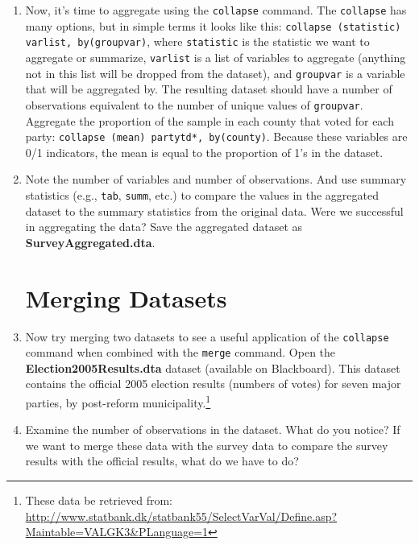 \documentclass[a4paper,12pt]{article}
\begin{document}
\begin{enumerate}
\item Now, it's time to aggregate using the \texttt{collapse} command. The \texttt{collapse} has many options, but in simple terms it looks like this: \texttt{collapse (statistic) varlist, by(groupvar)}, where \texttt{statistic} is the statistic we want to aggregate or summarize, \texttt{varlist} is a list of variables to aggregate (anything not in this list will be dropped from the dataset), and \texttt{groupvar} is a variable that will be aggregated by. The resulting dataset should have a number of observations equivalent to the number of unique values of \texttt{groupvar}. Aggregate the proportion of the sample in each county that voted for each party: \texttt{collapse (mean) partytd*, by(county)}. Because these variables are 0/1 indicators, the mean is equal to the proportion of 1's in the dataset.

\item Note the number of variables and number of observations. And use summary statistics (e.g., \texttt{tab}, \texttt{summ}, etc.) to compare the values in the aggregated dataset to the summary statistics from the original data. Were we successful in aggregating the data? Save the aggregated dataset as \textbf{SurveyAggregated.dta}. 

\section*{Merging Datasets}



\item Now try merging two datasets to see a useful application of the \texttt{collapse} command when combined with the \texttt{merge} command. Open the \textbf{Election2005Results.dta} dataset (available on Blackboard). This dataset contains the official 2005 election results (numbers of votes) for seven major parties, by post-reform municipality.\footnote{These data be retrieved from: \url{http://www.statbank.dk/statbank55/SelectVarVal/Define.asp?Maintable=VALGK3&PLanguage=1}}

\item Examine the number of observations in the dataset. What do you notice? If we want to merge these data with the survey data to compare the survey results with the official results, what do we have to do?


\end{enumerate}
\end{document}
